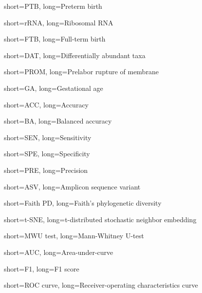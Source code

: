 {
    short=PTB,
    long=Preterm birth
}

{
    short=rRNA,
    long=Ribosomal RNA
}

{
    short=FTB,
    long=Full-term birth
}

{
    short=DAT,
    long=Differentially abundant taxa
}

{
    short=PROM,
    long=Prelabor rupture of membrane
}

{
    short=GA,
    long=Gestational age
}

{
    short=ACC,
    long=Accuracy
}

{
    short=BA,
    long=Balanced accuracy
}

{
    short=SEN,
    long=Sensitivity
}

{
    short=SPE,
    long=Specificity
}

{
    short=PRE,
    long=Precision
}

{
    short=ASV,
    long=Amplicon sequence variant
}

{
    short=Faith PD,
    long=Faith's phylogenetic diversity
}

{
    short=t-SNE,
    long=t-distributed stochastic neighbor embedding
}

{
    short=MWU test,
    long=Mann-Whitney U-test
}

{
    short=AUC,
    long=Area-under-curve 
}

{
    short=F1,
    long=F1 score
}

{
    short=ROC curve,
    long=Receiver-operating characteristics curve
}
